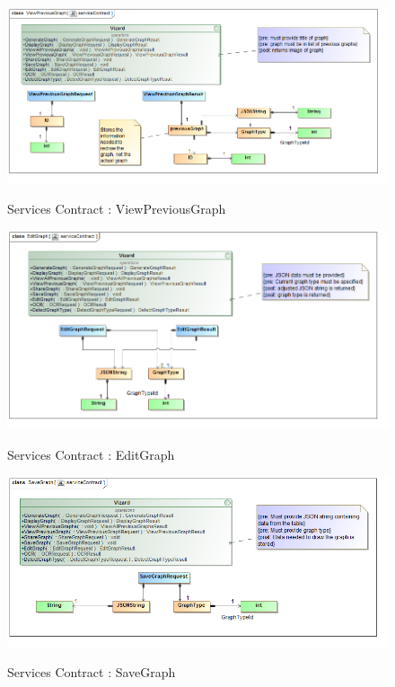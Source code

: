 \documentclass[a4paper,12pt]{article}
\begin{document}
	\begin{figure}[H]
		\includegraphics[width=\textwidth]{Images/class__ViewPreviousGraph__serviceContract.png}  \\
		\caption{Services Contract : ViewPreviousGraph}
	\end{figure}
	
	\begin{figure}[H]
		\includegraphics[width=\textwidth]{Images/class__EditGraph__serviceContract.png}  \\
		\caption{Services Contract : EditGraph}
	\end{figure}
	
	\begin{figure}[H]
		\includegraphics[width=\textwidth]{Images/class__SaveGraph__serviceContract.png}  \\
		\caption{Services Contract : SaveGraph}
	\end{figure}
	
\end{document}

